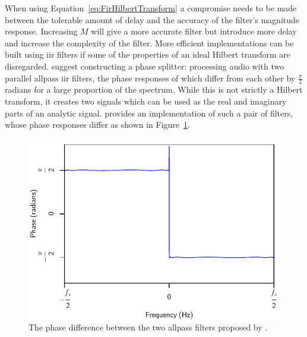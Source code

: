 			When using Equation~\ref{eq:FirHilbertTransform} a compromise needs to be made between the
			tolerable amount of delay and the accuracy of the filter's magnitude response. Increasing $M$ will
			give a more accurate filter but introduce more delay and increase the complexity of the filter.
			More efficient implementations can be built using \acrshort{iir} filters if some of the properties
			of an ideal Hilbert transform are disregarded.  \citet{oppenheim2014discrete} suggest constructing
			a phase splitter: processing audio with two parallel allpass \acrshort{iir} filters, the phase
			responses of which differ from each other by $\frac{\pi}{2}$ radians for a large proportion of the
			spectrum. While this is not strictly a Hilbert transform, it creates two signals which can be used
			as the real and imaginary parts of an analytic signal. \citet{niemitalo2003hilbert} provides an
			implementation of such a pair of filters, whose phase responses differ as shown in
			Figure~\ref{fig:IIRHilbertPhase}.

			\begin{figure}[h!]
				\centering
				\includegraphics{chapter2/Images/IIRHilbertPhaseResponses.pdf}
				\caption{The phase difference between the two allpass filters proposed by
					 \citet{niemitalo2003hilbert}.}
				\label{fig:IIRHilbertPhase}
			\end{figure}

